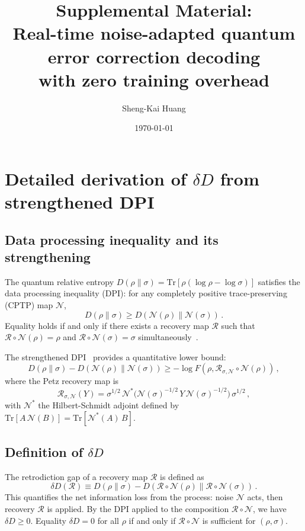 \documentclass[12pt]{article}
\title{Supplemental Material:\\Real-time noise-adapted quantum error correction decoding\\with zero training overhead}
\author{Sheng-Kai Huang}
\date{\today}
\newcommand{\Tr}{\mathrm{Tr}}
\newcommand{\Petz}{\mathcal{R}}
\newcommand{\chan}{\mathcal{N}}
\newcommand{\dd}{\delta\!D}
\begin{document}
\maketitle

\tableofcontents

\section{Detailed derivation of $\dd$ from strengthened DPI}
\label{sec:derivation}

\subsection{Data processing inequality and its strengthening}

The quantum relative entropy $D(\rho\|\sigma) = \Tr[\rho(\log\rho - \log\sigma)]$ satisfies the data processing inequality (DPI): for any completely positive trace-preserving (CPTP) map $\chan$,
\begin{equation}
  D(\rho\|\sigma) \geq D(\chan(\rho)\|\chan(\sigma))\,.
\end{equation}
Equality holds if and only if there exists a recovery map $\Petz$ such that $\Petz \circ \chan(\rho) = \rho$ and $\Petz \circ \chan(\sigma) = \sigma$ simultaneously~\cite{Petz1986}.

The strengthened DPI~\cite{Junge2018,Sutter2016} provides a quantitative lower bound:
\begin{equation}
  D(\rho\|\sigma) - D(\chan(\rho)\|\chan(\sigma)) \geq -\log F(\rho, \Petz_{\sigma,\chan} \circ \chan(\rho))\,,
\end{equation}
where the Petz recovery map is
\begin{equation}
  \Petz_{\sigma,\chan}(Y) = \sigma^{1/2}\,\chan^*\!\bigl(\chan(\sigma)^{-1/2}\,Y\,\chan(\sigma)^{-1/2}\bigr)\,\sigma^{1/2}\,,
\end{equation}
with $\chan^*$ the Hilbert-Schmidt adjoint defined by $\Tr[A\,\chan(B)] = \Tr[\chan^*(A)\,B]$.

\subsection{Definition of $\dd$}

The retrodiction gap of a recovery map $\Petz$ is defined as
\begin{equation}
  \dd(\Petz) \equiv D(\rho\|\sigma) - D(\Petz \circ \chan(\rho)\|\Petz \circ \chan(\sigma))\,.
\end{equation}
This quantifies the net information loss from the process: noise $\chan$ acts, then recovery $\Petz$ is applied. By the DPI applied to the composition $\Petz \circ \chan$, we have $\dd \geq 0$. Equality $\dd = 0$ for all $\rho$ if and only if $\Petz \circ \chan$ is sufficient for $(\rho, \sigma)$.
\end{document}
